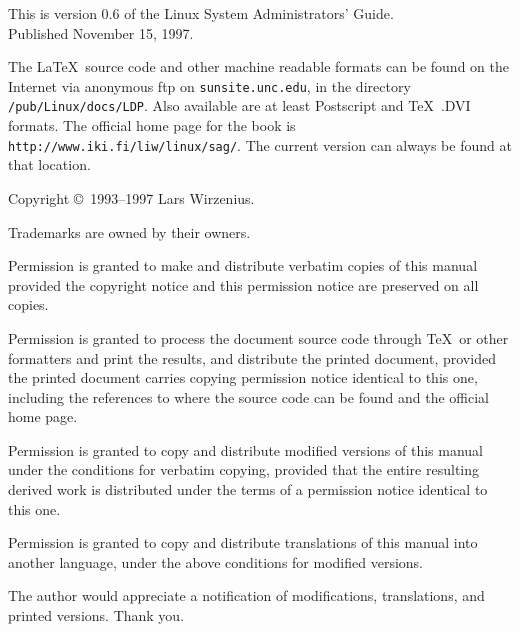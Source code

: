 \clearpage
 {}

\vfill

\noindent
This is version 0.6 of the Linux System Administrators' Guide. \\
Published November 15, 1997.

\vspace{5ex}

\noindent
The \LaTeX\ source code and other machine readable formats
can be found on the Internet via anonymous ftp on
\texttt{sunsite.unc.edu}, in the directory \texttt{/pub/Linux/docs/LDP}.
Also available are at least Postscript and \TeX\ .DVI formats.
The official home page for the book is
\texttt{http://www.iki.fi/liw/linux/sag/}. The current version can always
be found at that location.


\vspace{5ex}

\noindent
Copyright \copyright\ 1993--1997 Lars Wirzenius.

\vspace{5ex}

\noindent
Trademarks are owned by their owners.

\vspace{5ex}

{\small
\noindent
Permission is granted to make and distribute verbatim copies of
this manual provided the copyright notice and this permission notice
are preserved on all copies.

\noindent
Permission is granted to process the document source code
through \TeX\ or other formatters and print the
results, and distribute the printed document,
provided the printed document carries copying permission
notice identical to this one, including the references to where
the source code can be found and the official home page.

\noindent
Permission is granted to copy and distribute modified versions of this
manual under the conditions for verbatim copying, provided that the entire
resulting derived work is distributed under the terms of a permission
notice identical to this one. 

\noindent
Permission is granted to copy and distribute translations of this manual
into another language, under the above conditions for modified versions.


\noindent
The author would appreciate a notification of modifications, translations,
and printed versions.  Thank you.

}
\clearpage

